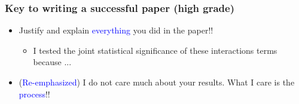 \documentclass[fleqn]{beamer}\usepackage[]{graphicx}\usepackage[]{color}
\begin{document}
\begin{frame}[c]
  \frametitle{Key to writing a successful paper (high grade)}
  \begin{itemize}
    \item Justify and explain \textcolor{blue}{everything} you did in the paper!!
      \begin{itemize}
        \item I tested the joint statistical significance of these interactions terms because ...
      \end{itemize}
    \item (\textcolor{blue}{Re-emphasized}) I do not care much about your results. What I care is the \textcolor{blue}{process}!!
  \end{itemize} 
\end{frame}
  
\end{document}
